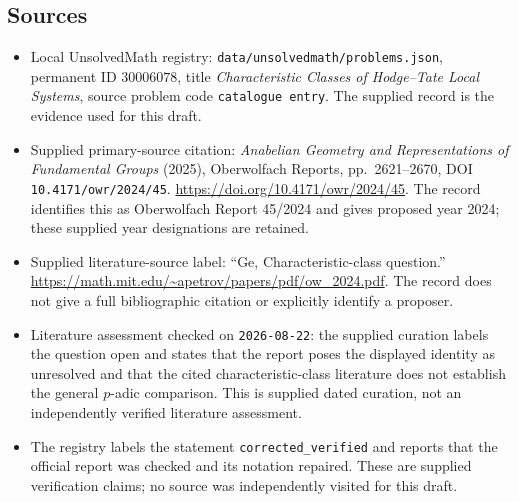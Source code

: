 \documentclass[11pt]{article}
\begin{document}
\subsection{Sources}
\begin{itemize}
\item Local UnsolvedMath registry: \texttt{data/unsolvedmath/problems.json}, permanent ID \(30006078\), title \emph{Characteristic Classes of Hodge--Tate Local Systems}, source problem code \texttt{catalogue entry}. The supplied record is the evidence used for this draft.
\item Supplied primary-source citation: \emph{Anabelian Geometry and Representations of Fundamental Groups} (2025), Oberwolfach Reports, pp.\ 2621--2670, DOI \texttt{10.4171/owr/2024/45}. \url{https://doi.org/10.4171/owr/2024/45}. The record identifies this as Oberwolfach Report 45/2024 and gives proposed year 2024; these supplied year designations are retained.
\item Supplied literature-source label: ``Ge, Characteristic-class question.'' \url{https://math.mit.edu/~apetrov/papers/pdf/ow_2024.pdf}. The record does not give a full bibliographic citation or explicitly identify a proposer.
\item Literature assessment checked on \texttt{2026-08-22}: the supplied curation labels the question open and states that the report poses the displayed identity as unresolved and that the cited characteristic-class literature does not establish the general \(p\)-adic comparison. This is supplied dated curation, not an independently verified literature assessment.
\item The registry labels the statement \texttt{corrected\_verified} and reports that the official report was checked and its notation repaired. These are supplied verification claims; no source was independently visited for this draft.
\end{itemize}
\end{document}
